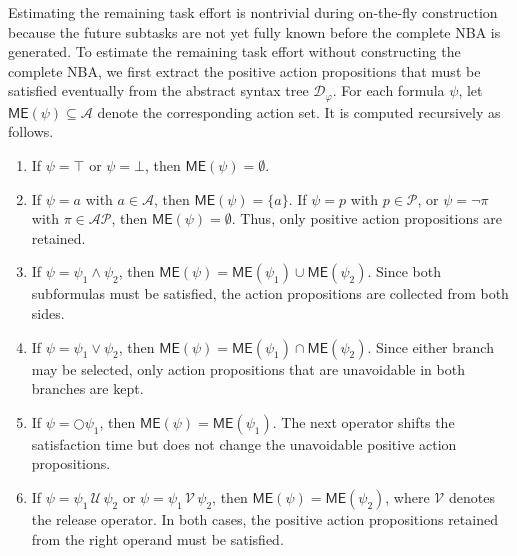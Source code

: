 \documentclass[lettersize,journal]{IEEEtran}
\theoremstyle{italiclemma}
\theoremstyle{italiclemma}
\theoremstyle{definition}
\begin{document}
Estimating the remaining task effort is nontrivial during on-the-fly construction because the future subtasks are not yet fully known before the complete NBA is generated. To estimate the remaining task effort without constructing the complete NBA, we first extract the positive action propositions that must  be satisfied eventually from the abstract syntax tree $\mathcal D_\varphi$.  For each formula $\psi$, let $\mathsf{ME}(\psi)\subseteq\mathcal A$ denote the corresponding action set. It is computed recursively as follows.
\begin{enumerate}
\item If $\psi=\top$ or $\psi=\bot$, then
$\mathsf{ME}(\psi)=\emptyset$.
\item If $\psi=a$ with $a\in\mathcal A$, then
$\mathsf{ME}(\psi)=\{a\}$.
If $\psi=p$ with $p\in\mathcal P$, or
$\psi=\neg\pi$ with $\pi\in\mathcal{AP}$, then
$\mathsf{ME}(\psi)=\emptyset$.
Thus, only positive action propositions are retained.
\item If \(\psi=\psi_1\wedge\psi_2\), then $  \mathsf{ME}(\psi)=\mathsf{ME}(\psi_1)\cup \mathsf{ME}(\psi_2).$
    Since both subformulas must be satisfied, the action propositions are collected from both sides.
\item If \(\psi=\psi_1\vee\psi_2\), then $  \mathsf{ME}(\psi)= \mathsf{ME}(\psi_1)\cap \mathsf{ME}(\psi_2). $
    Since either branch may be selected, only action propositions that are unavoidable in both branches are kept.
\item If \(\psi=\bigcirc\psi_1\), then $\mathsf{ME}(\psi)=\mathsf{ME}(\psi_1). $ The next operator shifts the satisfaction time but does not change the unavoidable positive action propositions.
\item If
  \(\psi=\psi_1\,\mathcal U\,\psi_2\) or
  \(\psi=\psi_1\,\mathcal V\,\psi_2\), then
  \(\mathsf{ME}(\psi)=\mathsf{ME}(\psi_2)\), where
  \(\mathcal V\) denotes the release operator. In both cases, the
  positive action propositions retained from the right operand must be satisfied.
\end{enumerate}
\end{document}
